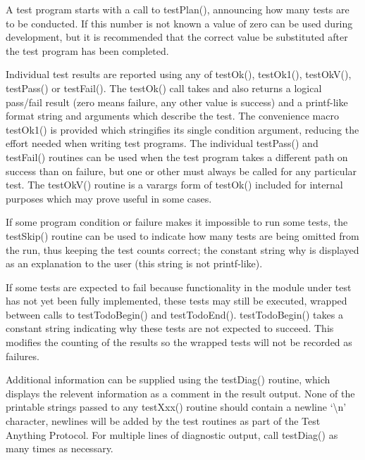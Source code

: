 A test program starts with a call to testPlan(), announcing how many tests are to be conducted.
If this number is not known a value of zero can be used during development, but it is recommended that the correct value be substituted after the test program has been completed.

Individual test results are reported using any of testOk(), testOk1(), testOkV(), testPass() or testFail().
The testOk() call takes and also returns a logical pass/fail result (zero means failure, any other value is success) and a printf-like format string and arguments which describe the test.
The convenience macro testOk1() is provided which stringifies its single condition argument, reducing the effort needed when writing test programs.
The individual testPass() and testFail() routines can be used when the test program takes a different path on success than on failure, but one or other must always be called for any particular test.
The testOkV() routine is a varargs form of testOk() included for internal purposes which may prove useful in some cases.

If some program condition or failure makes it impossible to run some tests, the testSkip() routine can be used to indicate how many tests are being omitted from the run, thus keeping the test counts correct; the constant string why is displayed as an explanation to the user (this string is not printf-like).

If some tests are expected to fail because functionality in the module under test has not yet been fully implemented, these tests may still be executed, wrapped between calls to testTodoBegin() and testTodoEnd().
testTodoBegin() takes a constant string indicating why these tests are not expected to succeed.
This modifies the counting of the results so the wrapped tests will not be recorded as failures.

Additional information can be supplied using the testDiag() routine, which displays the relevent information as a comment in the result output.
None of the printable strings passed to any testXxx() routine should contain a newline `\textbackslash{}n' character, newlines will be added by the test routines as part of the Test Anything Protocol.
For multiple lines of diagnostic output, call testDiag() as many times as necessary.

